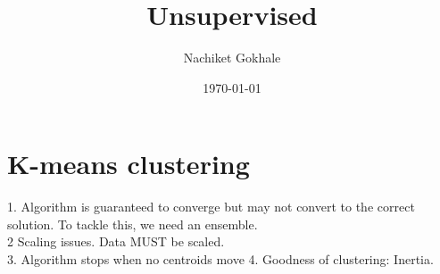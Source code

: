 \documentclass{article}
\begin{document}
\title{Unsupervised}
\author{Nachiket Gokhale}
\date{\today}
\maketitle
\section{K-means clustering}
1. Algorithm is guaranteed to converge but may not convert to the correct solution. To tackle this, we need an ensemble.\\
2 Scaling issues. Data MUST be scaled.\\
3. Algorithm stops when no centroids move
4. Goodness of clustering: Inertia.
\end{document}
